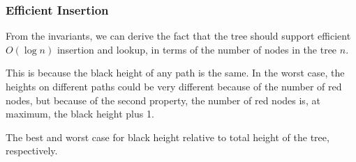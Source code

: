 \documentclass[aspectratio=169, handout]{beamer}
\begin{document}
\begin{frame}[fragile]
  \frametitle{Efficient Insertion}

  From the invariants, we can derive the fact that the tree should support
  efficient $O(\log n)$ insertion and lookup, in terms
  of the number of nodes in the tree $n$.

  \pause
  \vspace{\fill}

  This is because the black height of any path is the same. In the worst case,
  the heights on different paths could be very different because of the number of
  red nodes, but because of the second property, the number of red nodes is,
  at maximum, the black height plus 1.

  \pause
  \vspace{\fill}

  \begin{minipage}{0.33\textwidth}
    \begin{center}
    \end{center}
  \end{minipage}
  \begin{minipage}{0.32\textwidth}
    \begin{center}
      \small
      The best and worst case for black height relative to total height of the tree,
      respectively.

    \end{center}
  \end{minipage}
  \begin{minipage}{0.33\textwidth}
    \begin{center}
    \end{center}
  \end{minipage}
\end{frame}
\end{document}
